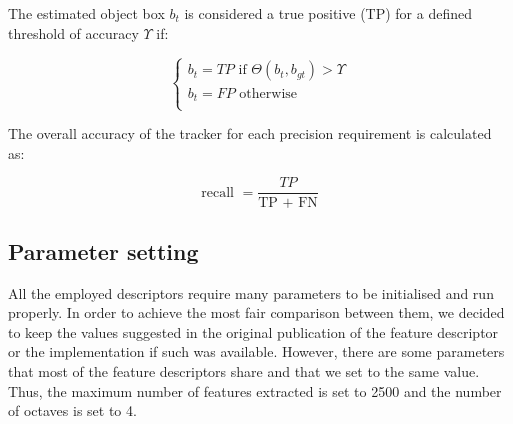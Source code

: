 The estimated object box \textit{$b_{t}$} is considered a true positive (TP) for a defined threshold of
accuracy $\Upsilon$ if:

\begin{equation}
\begin{cases}
b_{t} = TP  \text{ if } \Theta(b_{t}, b_{gt}) > \Upsilon \\
b_{t} = FP  \text{ otherwise }\\
\end{cases}
\end{equation}

The overall accuracy of the tracker for each precision requirement is calculated as:

\begin{equation}
\text{recall } = \frac{TP}{\text{TP } + \text{ FN}}
\end{equation}


\subsection{Parameter setting}

All the employed descriptors require many parameters to be initialised and run properly. In order to achieve the most fair comparison between them, we decided to keep the values suggested in the original publication of the feature descriptor or the implementation if such was available. However, there are some parameters that most of the feature descriptors share and that we set to the same value. Thus, the maximum number of features extracted is set to 2500 and the number of octaves is set to 4.



